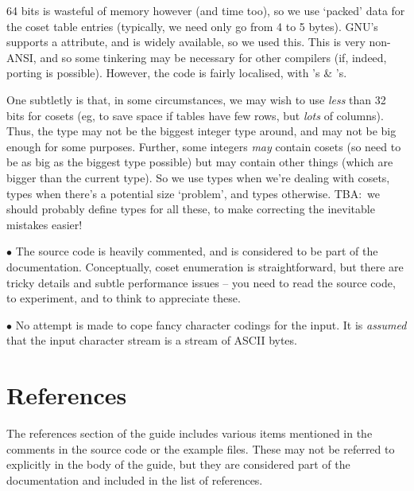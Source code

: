 64 bits is wasteful of memory however (and time too), so we use `packed' 
  data for the coset table entries (typically, we need only go from 4 to 5 
  bytes).
GNU's  supports a  attribute, and is widely available,
  so we used this.
This is very non-ANSI, and so some tinkering may be necessary for other
  compilers (if, indeed, porting is possible).
However, the code is fairly localised, with 's \&
  's.

One subtletly is that, in some circumstances, we may wish to use 
  \emph{less} than 32 bits for cosets (eg, to save space if tables have few
  rows, but \emph{lots} of columns).
Thus, the  type may not be the biggest integer type around, and
  may not be big enough for some purposes.
Further, some integers \emph{may} contain cosets (so need to be as big as
  the biggest  type possible) but may contain other things
  (which are bigger than the current  type).
So we use  types when we're dealing with cosets,  
   types when there's a potential size `problem', and  
  types otherwise.
TBA:\ we should probably define types for all these, to make correcting
  the inevitable mistakes easier!

$\bullet$
The source code is heavily commented, and is considered to be part of the
  documentation.
Conceptually, coset enumeration is straightforward, but there are tricky 
  details and subtle performance issues -- you need to read the source 
  code, to experiment, and to think to appreciate these.

$\bullet$
No attempt is made to cope fancy character codings for the input.
It is \emph{assumed} that the input character stream is a stream of ASCII
  bytes.

\section{References}

The references section of the guide includes various items mentioned in the
  comments in the source code or the example files.
These may not be referred to explicitly in the body of the guide, but they are
  considered part of the documentation and included in the list of references.



